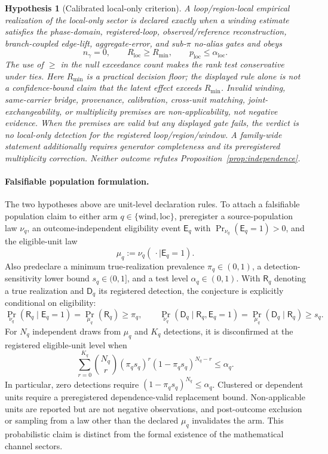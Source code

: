 \documentclass[11pt]{article}
\newtheorem{hypothesis}[theorem]{Hypothesis}
\theoremstyle{definition}
\begin{document}
\begin{hypothesis}[Calibrated local-only criterion]
\label{hyp:local-only}
A loop/region-local empirical realization of the local-only sector is
declared exactly when a winding estimate satisfies the phase-domain,
registered-loop, observed/reference reconstruction, branch-coupled
edge-lift, aggregate-error, and
sub-\(\pi\) no-alias gates and obeys
\[
n_\gamma=0,
\qquad R_{\mathrm{loc}}\ge R_{\min},
\qquad p_{\mathrm{loc}}\le\alpha_{\mathrm{loc}}.
\]
The use of \(\ge\) in the null exceedance count makes the rank test
conservative under ties.  Here \(R_{\min}\) is a practical decision floor;
the displayed rule alone is not a confidence-bound claim that the latent
effect exceeds \(R_{\min}\).  Invalid winding, same-carrier bridge,
provenance, calibration, cross-unit matching, joint-exchangeability, or
multiplicity premises
are non-applicability, not negative evidence.  When the premises are valid
but any displayed gate fails, the verdict is \emph{no local-only
detection} for the registered loop/region/window.  A family-wide statement
additionally requires generator completeness and its preregistered
multiplicity correction.  Neither outcome refutes
Proposition~\ref{prop:independence}.
\end{hypothesis}

\paragraph{Falsifiable population formulation.}
The two hypotheses above are unit-level declaration rules.  To attach a
falsifiable population claim to either arm
\(q\in\{\mathrm{wind},\mathrm{loc}\}\), preregister a source-population law
\(\nu_q\), an outcome-independent eligibility event \(\mathsf E_q\) with
\(\Pr_{\nu_q}(\mathsf E_q=1)>0\), and the eligible-unit law
\[
\mu_q:=\nu_q(\,\cdot\mid\mathsf E_q=1).
\]
Also predeclare a minimum true-realization prevalence
\(\pi_q\in(0,1)\), a detection-sensitivity lower bound
\(s_q\in(0,1]\), and a test level \(\alpha_q\in(0,1)\).  With
\(\mathsf R_q\) denoting a true realization and \(\mathsf D_q\) its
registered detection, the conjecture is explicitly conditional on
eligibility:
\[
\Pr_{\nu_q}(\mathsf R_q\mid\mathsf E_q=1)
 =\Pr_{\mu_q}(\mathsf R_q)\ge\pi_q,
\qquad
\Pr_{\nu_q}(\mathsf D_q\mid\mathsf R_q,\mathsf E_q=1)
 =\Pr_{\mu_q}(\mathsf D_q\mid\mathsf R_q)\ge s_q.
\]
For \(N_q\) independent draws from \(\mu_q\) and \(K_q\) detections, it is
disconfirmed at the registered eligible-unit level when
\[
\sum_{r=0}^{K_q}\binom{N_q}{r}
 (\pi_qs_q)^r(1-\pi_qs_q)^{N_q-r}\le\alpha_q.
\]
In particular, zero detections require
\((1-\pi_qs_q)^{N_q}\le\alpha_q\).  Clustered or dependent units require a
preregistered dependence-valid replacement bound.  Non-applicable units
are reported but are not negative observations, and post-outcome exclusion
or sampling from a law other than the declared \(\mu_q\) invalidates the
arm.  This probabilistic claim is distinct from the formal existence of the
mathematical channel sectors.
\end{document}
